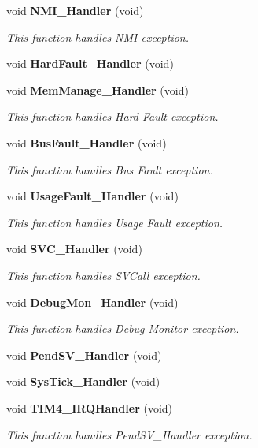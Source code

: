 \begin{DoxyCompactItemize}
\item 
void \textbf{ N\+M\+I\+\_\+\+Handler} (void)
\begin{DoxyCompactList}\small\item\em This function handles N\+MI exception. \end{DoxyCompactList}\item 
void \textbf{ Hard\+Fault\+\_\+\+Handler} (void)
\item 
void \textbf{ Mem\+Manage\+\_\+\+Handler} (void)
\begin{DoxyCompactList}\small\item\em This function handles Hard Fault exception. \end{DoxyCompactList}\item 
void \textbf{ Bus\+Fault\+\_\+\+Handler} (void)
\begin{DoxyCompactList}\small\item\em This function handles Bus Fault exception. \end{DoxyCompactList}\item 
void \textbf{ Usage\+Fault\+\_\+\+Handler} (void)
\begin{DoxyCompactList}\small\item\em This function handles Usage Fault exception. \end{DoxyCompactList}\item 
void \textbf{ S\+V\+C\+\_\+\+Handler} (void)
\begin{DoxyCompactList}\small\item\em This function handles S\+V\+Call exception. \end{DoxyCompactList}\item 
void \textbf{ Debug\+Mon\+\_\+\+Handler} (void)
\begin{DoxyCompactList}\small\item\em This function handles Debug Monitor exception. \end{DoxyCompactList}\item 
void \textbf{ Pend\+S\+V\+\_\+\+Handler} (void)
\item 
void \textbf{ Sys\+Tick\+\_\+\+Handler} (void)
\item 
void \textbf{ T\+I\+M4\+\_\+\+I\+R\+Q\+Handler} (void)
\begin{DoxyCompactList}\small\item\em This function handles Pend\+S\+V\+\_\+\+Handler exception. \end{DoxyCompactList}\end{DoxyCompactItemize}


